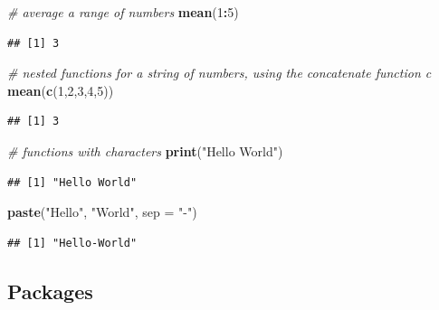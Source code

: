 \documentclass[
]{book}
\newenvironment{Shaded}{\begin{snugshade}}{\end{snugshade}}
\newcommand{\AttributeTok}[1]{\textcolor[rgb]{0.13,0.29,0.53}{#1}}
\newcommand{\CommentTok}[1]{\textcolor[rgb]{0.56,0.35,0.01}{\textit{#1}}}
\newcommand{\DecValTok}[1]{\textcolor[rgb]{0.00,0.00,0.81}{#1}}
\newcommand{\FunctionTok}[1]{\textcolor[rgb]{0.13,0.29,0.53}{\textbf{#1}}}
\newcommand{\NormalTok}[1]{#1}
\newcommand{\SpecialCharTok}[1]{\textcolor[rgb]{0.81,0.36,0.00}{\textbf{#1}}}
\newcommand{\StringTok}[1]{\textcolor[rgb]{0.31,0.60,0.02}{#1}}
\begin{document}
\begin{Shaded}
\begin{Highlighting}[]
\CommentTok{\# average a range of numbers}
\FunctionTok{mean}\NormalTok{(}\DecValTok{1}\SpecialCharTok{:}\DecValTok{5}\NormalTok{)}
\end{Highlighting}
\end{Shaded}

\begin{verbatim}
## [1] 3
\end{verbatim}

\begin{Shaded}
\begin{Highlighting}[]
\CommentTok{\# nested functions for a string of numbers, using the concatenate function \textquotesingle{}c\textquotesingle{}}
\FunctionTok{mean}\NormalTok{(}\FunctionTok{c}\NormalTok{(}\DecValTok{1}\NormalTok{,}\DecValTok{2}\NormalTok{,}\DecValTok{3}\NormalTok{,}\DecValTok{4}\NormalTok{,}\DecValTok{5}\NormalTok{))}
\end{Highlighting}
\end{Shaded}

\begin{verbatim}
## [1] 3
\end{verbatim}

\begin{Shaded}
\begin{Highlighting}[]
\CommentTok{\# functions with characters}
\FunctionTok{print}\NormalTok{(}\StringTok{"Hello World"}\NormalTok{)}
\end{Highlighting}
\end{Shaded}

\begin{verbatim}
## [1] "Hello World"
\end{verbatim}

\begin{Shaded}
\begin{Highlighting}[]
\FunctionTok{paste}\NormalTok{(}\StringTok{"Hello"}\NormalTok{, }\StringTok{"World"}\NormalTok{, }\AttributeTok{sep =} \StringTok{"{-}"}\NormalTok{)}
\end{Highlighting}
\end{Shaded}

\begin{verbatim}
## [1] "Hello-World"
\end{verbatim}

\hypertarget{packages}{%
\subsection{Packages}\label{packages}}
\end{document}
